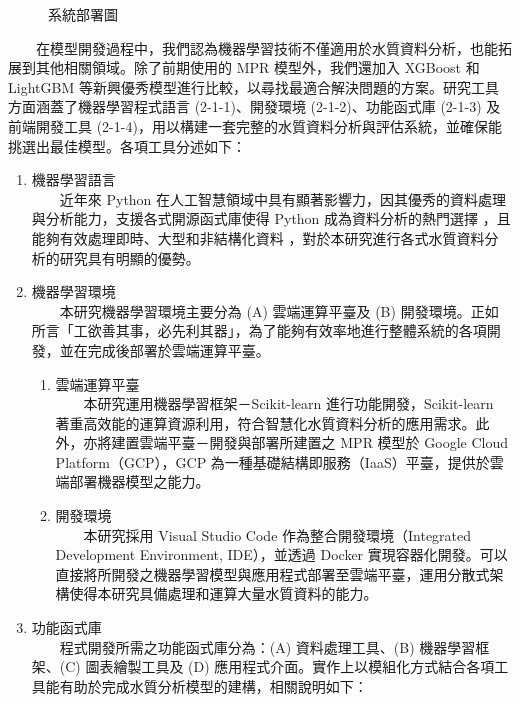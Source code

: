 \documentclass[12pt,a4paper]{article}
\begin{document}
\begin{enumerate}
\begin{enumerate}[label=\arabic*.]
\begin{figure}[H]
\begin{minipage}{0.45\textwidth}
            \caption{系統部署圖}
            \label{fig:deployment_diagram}
        \end{minipage}
    \end{figure}
　　在模型開發過程中，我們認為機器學習技術不僅適用於水質資料分析，也能拓展到其他相關領域。除了前期使用的 MPR 模型外，我們還加入 XGBoost 和 LightGBM 等新興優秀模型進行比較，以尋找最適合解決問題的方案。研究工具方面涵蓋了機器學習程式語言 (2-1-1)、開發環境 (2-1-2)、功能函式庫 (2-1-3) 及前端開發工具 (2-1-4)，用以構建一套完整的水質資料分析與評估系統，並確保能挑選出最佳模型。各項工具分述如下：
    \begin{enumerate}[label=2-1-\arabic*.]
        \item 機器學習語言\\
        　　近年來 Python 在人工智慧領域中具有顯著影響力，因其優秀的資料處理與分析能力，支援各式開源函式庫使得 Python 成為資料分析的熱門選擇 \cite{ref12}，且能夠有效處理即時、大型和非結構化資料 \cite{ref13}，對於本研究進行各式水質資料分析的研究具有明顯的優勢。
        \item 機器學習環境\\
        　　本研究機器學習環境主要分為 (A) 雲端運算平臺及 (B) 開發環境。正如所言「工欲善其事，必先利其器」，為了能夠有效率地進行整體系統的各項開發，並在完成後部署於雲端運算平臺。
                    \begin{enumerate}[label=\Alph*.]
                        \item 雲端運算平臺\\
                        　　本研究運用機器學習框架－Scikit-learn 進行功能開發，Scikit-learn 著重高效能的運算資源利用，符合智慧化水質資料分析的應用需求。此外，亦將建置雲端平臺－開發與部署所建置之 MPR 模型於 Google Cloud Platform（GCP），GCP 為一種基礎結構即服務（IaaS）平臺，提供於雲端部署機器模型之能力。
                        \item 開發環境\\
                        　　本研究採用 Visual Studio Code 作為整合開發環境（Integrated Development Environment, IDE），並透過 Docker 實現容器化開發。可以直接將所開發之機器學習模型與應用程式部署至雲端平臺，運用分散式架構使得本研究具備處理和運算大量水質資料的能力。
                    \end{enumerate}
        \item 功能函式庫\\
        　　程式開發所需之功能函式庫分為：(A) 資料處理工具、(B) 機器學習框架、(C) 圖表繪製工具及 (D) 應用程式介面。實作上以模組化方式結合各項工具能有助於完成水質分析模型的建構，相關說明如下：

\end{enumerate}
\end{enumerate}
\end{enumerate}
\end{document}
